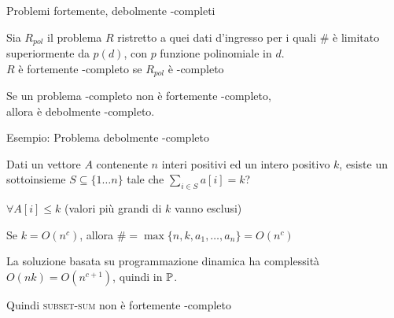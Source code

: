 \begin{frame}{Problemi fortemente, debolmente \NP-completi}

\vspace{-9pt}
\begin{myboxtitle}[Definizione]
Sia $R_{\mathit{pol}}$ il problema $R$ ristretto a quei dati d'ingresso per i quali \# è
limitato superiormente da $p(d)$, con $p$ funzione polinomiale in $d$. \\
$R$ è \alert{fortemente \NP-completo} se $R_{\mathit{pol}}$ è \NP-completo
\end{myboxtitle}

\begin{myboxtitle}[Definizione]
Se un problema \NP-completo non è fortemente \NP-completo, \\
allora è \alert{debolmente \NP-completo}.    
\end{myboxtitle}

\end{frame}

\begin{frame}{Esempio: Problema debolmente \NP-completo}

\vspace{-9pt}
\begin{myboxtitle}
Dati un vettore $A$ contenente $n$ interi positivi ed un intero positivo $k$, \alert{esiste} un sottoinsieme $S \subseteq \{ 1 \ldots n\}$ tale che 
$\displaystyle \sum_{i \in S} a[i] = k$?
\end{myboxtitle}

\begin{myboxtitle}
\BIL
\item $\forall A[i] \leq k$ (valori più grandi di $k$ vanno esclusi)
\item Se $k=O(n^c)$, allora $\# = \max \{n, k, a_1, \ldots, a_n\} = O(n^c)$
\item La soluzione basata su programmazione dinamica ha complessità
$O(nk) = O(n^{c+1})$, quindi in $\mbox{\sc $\mathbb{P}$}$.
\item Quindi \textsc{subset-sum} non è fortemente \NP-completo
\EIL
\end{myboxtitle}

\end{frame}


